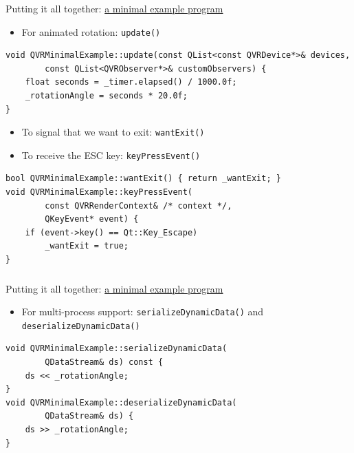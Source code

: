 \documentclass[utf8,stillsansserifmath,fleqn,t]{beamer}
\newcommand{\code}[1]{\texttt{#1}}
\begin{document}
\begin{frame}[fragile]
\frametitle{\insertsection}
Putting it all together:
\href{https://git.marlam.de/gitweb/?p=qvr.git;a=tree;hb=HEAD;f=qvr-example-opengl-minimal}{a minimal example program}
\begin{itemize}
    \item For animated rotation: \code{update()}
\end{itemize}
{\small
\begin{lstlisting}
void QVRMinimalExample::update(const QList<const QVRDevice*>& devices,
        const QList<QVRObserver*>& customObservers) {
    float seconds = _timer.elapsed() / 1000.0f;
    _rotationAngle = seconds * 20.0f;
}
\end{lstlisting}
}
\begin{itemize}
    \item To signal that we want to exit: \code{wantExit()}
    \item To receive the ESC key: \code{keyPressEvent()}
\end{itemize}
{\small
\begin{lstlisting}
bool QVRMinimalExample::wantExit() { return _wantExit; }
void QVRMinimalExample::keyPressEvent(
        const QVRRenderContext& /* context */,
        QKeyEvent* event) {
    if (event->key() == Qt::Key_Escape)
        _wantExit = true;
}
\end{lstlisting}
}
\end{frame}

\begin{frame}[fragile]
\frametitle{\insertsection}
Putting it all together:
\href{https://git.marlam.de/gitweb/?p=qvr.git;a=tree;hb=HEAD;f=qvr-example-opengl-minimal}{a minimal example program}
\begin{itemize}
    \item For multi-process support: \code{serializeDynamicData()} and \code{deserializeDynamicData()}
\end{itemize}
{\small
\begin{lstlisting}
void QVRMinimalExample::serializeDynamicData(
        QDataStream& ds) const {
    ds << _rotationAngle;
}
void QVRMinimalExample::deserializeDynamicData(
        QDataStream& ds) {
    ds >> _rotationAngle;
}
\end{lstlisting}
}
\end{frame}
\end{document}
